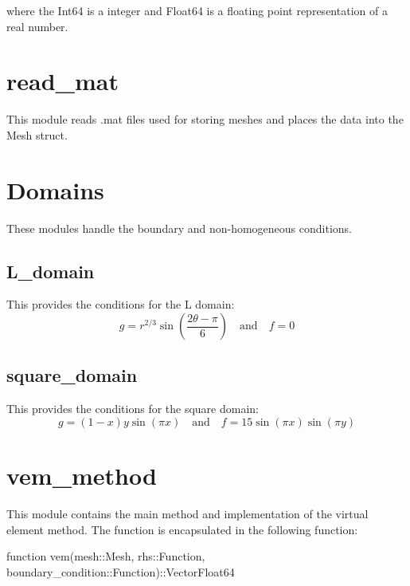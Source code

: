 \documentclass{report}
\begin{document}
where the Int64 is a integer and Float64 is a floating point representation of a real number.

\section{read\_mat}

This module reads .mat files used for storing meshes and places the data into the Mesh struct.


\section{Domains}

These modules handle the boundary and non-homogeneous conditions.

\subsection{L\_domain}

This provides the conditions for the L domain:
$$g = r^{2/3}\sin{\left(\frac{2\theta-\pi}{6}\right)} \quad \text{and} \quad f =0 $$

\subsection{square\_domain}

This provides the conditions for the square domain:
$$g = (1-x)y\sin(\pi x) \quad \text{and} \quad f = 15\sin(\pi x)\sin(\pi y)$$


\section{vem\_method}

This module contains the main method and implementation of the virtual element method.
The function is encapsulated in the following function:

\begin{jllisting}[style=JuliaStyle]
function vem(mesh::Mesh, rhs::Function, boundary_condition::Function)::Vector{Float64}
\end{jllisting}
\end{document}

